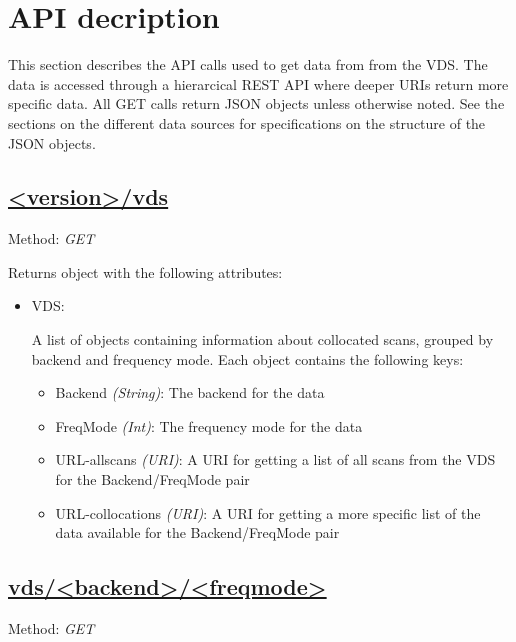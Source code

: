 \section{API decription}
\label{sec:api}
This section describes the API calls used to get data from from the VDS.  The
data is accessed through a hierarcical REST API where deeper URIs return more
specific data. All GET calls return JSON objects unless otherwise noted. See
the sections on the different data sources for specifications on the structure
of the JSON objects.


\subsection{\url{<version>/vds}}
Method: \emph{GET}

Returns object with the following attributes:
\begin{itemize}
    \item VDS:

        A list of objects containing information about collocated scans,
        grouped by backend and frequency mode.
        Each object contains the following keys:

        \begin{itemize}
            \item Backend \emph{(String)}: The backend for the data
            \item FreqMode \emph{(Int)}: The frequency mode for the data
            \item URL-allscans \emph{(URI)}: A URI for getting a list of all
                scans from the VDS for the Backend/FreqMode pair
            \item URL-collocations \emph{(URI)}: A URI for getting a more
                specific list of the data available for the Backend/FreqMode
                pair
        \end{itemize}
\end{itemize}


\subsection{\url{vds/<backend>/<freqmode>}}
Method: \emph{GET}

